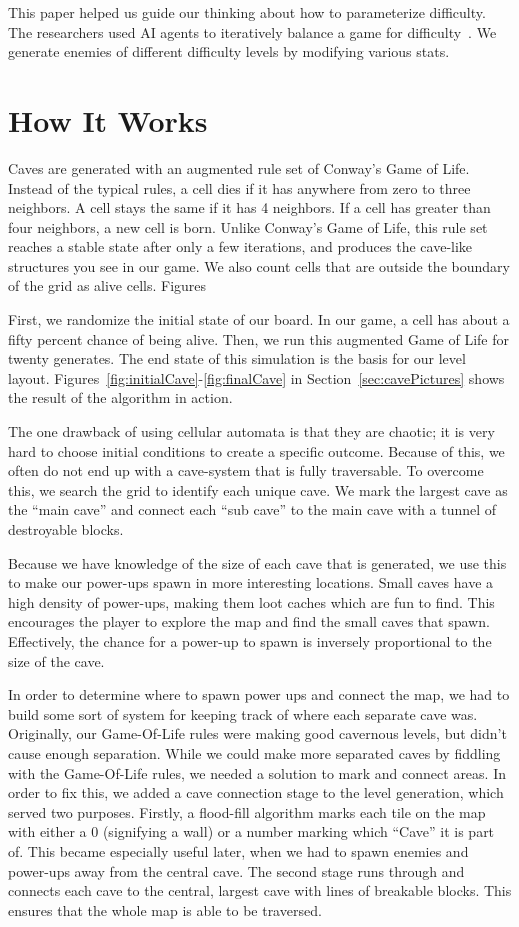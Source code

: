 \documentclass[a4paper, 12pt]{article}
\begin{document}
This paper helped us guide our thinking about how to parameterize difficulty.
The researchers used AI agents to iteratively balance a game for
difficulty~\autocite{liu2017}. We generate enemies of different difficulty
levels by modifying various stats.


\section{How It Works}

Caves are generated with an augmented rule set of Conway's Game of Life. Instead
of the typical rules, a cell dies if it has anywhere from zero to three
neighbors. A cell stays the same if it has 4 neighbors. If a cell has greater
than four neighbors, a new cell is born. Unlike Conway's Game of Life, this rule
set reaches a stable state after only a few iterations, and produces the
cave-like structures you see in our game. We also count cells that are outside
the boundary of the grid as alive cells. Figures

First, we randomize the initial state of our board. In our game, a cell has
about a fifty percent chance of being alive. Then, we run this augmented Game of
Life for twenty generates. The end state of this simulation is the basis for our
level layout. Figures~\ref{fig:initialCave}-\ref{fig:finalCave} in
Section~\ref{sec:cavePictures} shows the result of the algorithm in action.

The one drawback of using cellular automata is that they are chaotic; it is very
hard to choose initial conditions to create a specific outcome. Because of this,
we often do not end up with a cave-system that is fully traversable. To overcome
this, we search the grid to identify each unique cave. We mark the largest cave
as the ``main cave'' and connect each ``sub cave'' to the main cave with a
tunnel of destroyable blocks.

Because we have knowledge of the size of each cave that is generated, we use
this to make our power-ups spawn in more interesting locations. Small caves have
a high density of power-ups, making them loot caches which are fun to find. This
encourages the player to explore the map and find the small caves that spawn.
Effectively, the chance for a power-up to spawn is inversely proportional to the
size of the cave.

In order to determine where to spawn power ups and connect the map, we had to
build some sort of system for keeping track of where each separate cave was.
Originally, our Game-Of-Life rules were making good cavernous levels, but didn't
cause enough separation. While we could make more separated caves by fiddling
with the Game-Of-Life rules, we needed a solution to mark and connect areas. In
order to fix this, we added a cave connection stage to the level generation,
which served two purposes.  Firstly, a flood-fill algorithm marks each tile on
the map with either a 0 (signifying a wall) or a number marking which ``Cave''
it is part of. This became especially useful later, when we had to spawn enemies
and power-ups away from the central cave. The second stage runs through and
connects each cave to the central, largest cave with lines of breakable blocks.
This ensures that the whole map is able to be traversed.
\end{document}
